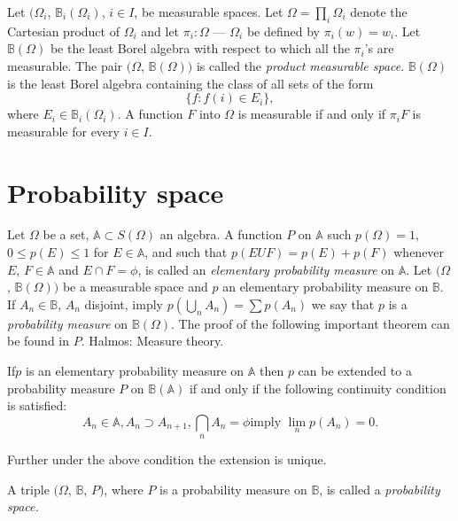 Let $(\Omega_i$, $ \mathbb{B}_i (\Omega_i) $, $ i \in I$, be
measurable spaces. Let $\Omega = \prod_i \Omega_i$ denote the Cartesian
product of $\Omega_i$ and let $\pi_i : \Omega$ --- $\Omega_i$ be defined
by $\pi_i(w) = w_i $. Let $\mathbb{B} (\Omega)$ be the least Borel
algebra with respect to which all the $\pi_i$'s are measurable. The
pair $(\Omega$, $ \mathbb{B} (\Omega))$ is called the \textit{product
  measurable space}. $\mathbb{B}(\Omega)$ is the least Borel algebra
containing the class of all sets of the form 
$$
\{ f: f(i) \in E_i \},
$$
where $E_i \in \mathbb{B}_i (\Omega_i)$. A function $F$ into $\Omega$
is measurable if and only if $\pi_i F$ is measurable for every $i \in
I$. 

\section{Probability space}\label{chap0-sec2}  

Let $\Omega$ be a set, $\mathbb{A} \subset S(\Omega)$ an algebra. A
function $P$ on $\mathbb{A}$ such $p(\Omega)=1$, $ 0 \leq p(E) \leq 1$
for $E \in \mathbb{A}$, and such that $p(EUF) = p(E) + p(F)$ whenever
$E$, $ F \in \mathbb{A}$ and $E \cap F = \phi$, is called an 
\textit{elementary probability measure} on $\mathbb{A}$. Let $(\Omega$, $
\mathbb{B} (\Omega))$ be a measurable space and $p$ an elementary
probability measure on $\mathbb{B}$. If $A_n \in \mathbb{B}$, $ A_n$
disjoint, imply $p(\bigcup \limits_{n} A_n) = \sum p(A_n)$ we say that
$p$ is a \textit{probability measure} on $\mathbb{B} (\Omega)$. The
proof of the following important theorem can be found in $P$. Halmos:
Measure theory. 

\begin{theorem*}[(Kolmogoroff)]  
 If\pageoriginale $p$ is an elementary probability measure on
 $\mathbb{A}$ then $p$ 
 can be extended to a probability measure $P$ on
 $\mathbb{B}(\mathbb{A})$ if and only if the following continuity
 condition is satisfied: 
 $$
 A_n \in \mathbb{A}, A_n \supset A_{n+1}, \bigcap_n A_n = \phi \text{
   imply } \lim_n p(A_n) =0. 
 $$

 Further under the above condition the extension is unique.
\end{theorem*}

\begin{defi*}
A triple $(\Omega$, $ \mathbb{B}$, $P)$, where $P$ is a probability
measure on $\mathbb{B}$, is called a {\em probability space.} 
\end{defi*} 
 

